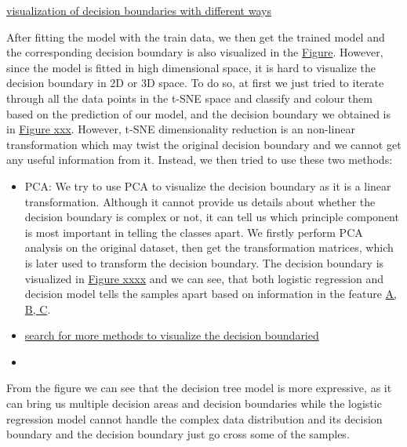 \documentclass{article}
\begin{document}


\underline{visualization of decision boundaries with different ways}

After fitting the model with the train data, we then get the trained model and the corresponding decision boundary is also visualized in the \underline{Figure}. However, since the model is fitted in high dimensional space, it is hard to visualize the decision boundary in 2D or 3D space. To do so, at first we just tried to iterate through all the data points in the t-SNE space and classify and colour them based on the prediction of our model, and the decision boundary we obtained is in \underline{Figure xxx}. However, t-SNE dimensionality reduction is an non-linear transformation which may twist the original decision boundary and we cannot get any useful information from it. Instead, we then tried to use these two methods:

\begin{itemize}
    \item PCA: We try to use PCA to visualize the decision boundary as it is a linear transformation. Although it cannot provide us details about whether the decision boundary is complex or not, it can tell us which principle component is most important in telling the classes apart. We firstly perform PCA analysis on the original dataset, then get the transformation matrices, which is later used to transform the decision boundary. The decision boundary is visualized in \underline{Figure xxxx} and we can see, that both logistic regression and decision model tells the samples apart based on information in the feature \underline{A, B, C}. 
    \item \underline{search for more methods to visualize the decision boundaried}
    \item %
\end{itemize}

From the figure we can see that the decision tree model is more expressive, as it can bring us multiple decision areas and decision boundaries while the logistic regression model cannot handle the complex data distribution and its decision boundary and the decision boundary just go cross some of the samples. 
\end{document}
